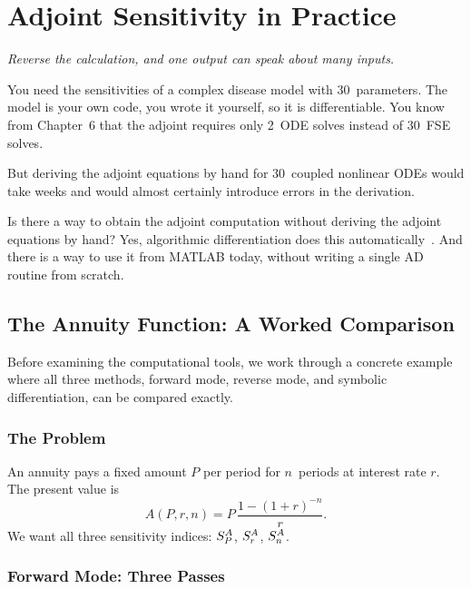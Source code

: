\chapter{Adjoint Sensitivity in Practice}

\begin{flushright}
\textit{Reverse the calculation, and one output can speak about many inputs.}
\end{flushright}

\bigskip

You need the sensitivities of a complex disease model with 30~parameters.
The model is your own code, you wrote it yourself, so it is differentiable.
You know from Chapter~6 that the adjoint requires only 2~ODE solves instead
of 30~FSE solves.

But deriving the adjoint equations by hand for 30~coupled nonlinear ODEs would
take weeks and would almost certainly introduce errors in the derivation.

Is there a way to obtain the adjoint computation without deriving the adjoint
equations by hand? Yes, algorithmic differentiation does this automatically~\cite{naumann2012art}.
And there is a way to use it from MATLAB today, without writing
a single AD routine from scratch.

\section{The Annuity Function: A Worked Comparison}
\label{sec:annuity}

Before examining the computational tools, we work through a concrete
example where all three methods, forward mode, reverse mode,
and symbolic differentiation, can be compared exactly.

\subsection{The Problem}

An annuity pays a fixed amount $P$ per period for $n$~periods at
interest rate $r$. The present value is
\begin{equation}
  A(P, r, n) = P\,\frac{1 - (1+r)^{-n}}{r}.
  \label{eq:annuity}
\end{equation}
We want all three sensitivity indices: $S_{P}^{A}$, $S_{r}^{A}$,
$S_{n}^{A}$.

\subsection{Forward Mode: Three Passes}

